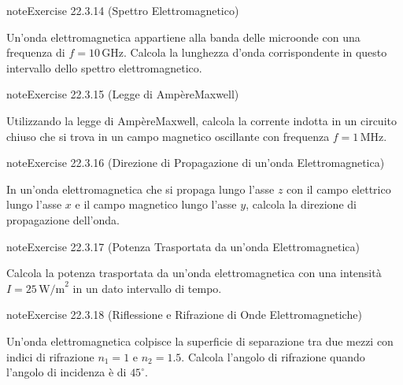 \documentclass[letterpaper,10pt,italian]{jupyterBook}
\begin{document}
\begin{sphinxadmonition}{note}{Exercise 22.3.14 (Spettro Elettromagnetico)}



\sphinxAtStartPar
Un’onda elettromagnetica appartiene alla banda delle microonde con una frequenza di \(f = 10 \, \text{GHz}\). Calcola la lunghezza d’onda corrispondente in questo intervallo dello spettro elettromagnetico.
\end{sphinxadmonition}
 \label{exercise:ch/electromagnetism/em-waves-problems-exercise-14}

\begin{sphinxadmonition}{note}{Exercise 22.3.15 (Legge di Ampère\sphinxhyphen{}Maxwell)}



\sphinxAtStartPar
Utilizzando la legge di Ampère\sphinxhyphen{}Maxwell, calcola la corrente indotta in un circuito chiuso che si trova in un campo magnetico oscillante con frequenza \(f = 1 \, \text{MHz}\).
\end{sphinxadmonition}
 \label{exercise:ch/electromagnetism/em-waves-problems-exercise-15}

\begin{sphinxadmonition}{note}{Exercise 22.3.16 (Direzione di Propagazione di un’onda Elettromagnetica)}



\sphinxAtStartPar
In un’onda elettromagnetica che si propaga lungo l’asse \(z\) con il campo elettrico lungo l’asse \(x\) e il campo magnetico lungo l’asse \(y\), calcola la direzione di propagazione dell’onda.
\end{sphinxadmonition}
 \label{exercise:ch/electromagnetism/em-waves-problems-exercise-16}

\begin{sphinxadmonition}{note}{Exercise 22.3.17 (Potenza Trasportata da un’onda Elettromagnetica)}



\sphinxAtStartPar
Calcola la potenza trasportata da un’onda elettromagnetica con una intensità \(I = 25 \, \text{W/m}^2\) in un dato intervallo di tempo.
\end{sphinxadmonition}
 \label{exercise:ch/electromagnetism/em-waves-problems-exercise-17}

\begin{sphinxadmonition}{note}{Exercise 22.3.18 (Riflessione e Rifrazione di Onde Elettromagnetiche)}



\sphinxAtStartPar
Un’onda elettromagnetica colpisce la superficie di separazione tra due mezzi con indici di rifrazione \(n_1 = 1\) e \(n_2 = 1.5\). Calcola l’angolo di rifrazione quando l’angolo di incidenza è di \(45^\circ\).
\end{sphinxadmonition}
\end{document}
